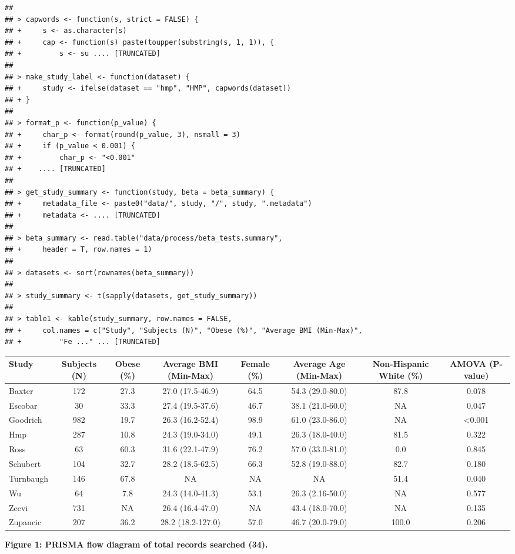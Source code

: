 \documentclass[12pt,]{article}
\begin{document}
\begin{verbatim}
## 
## > capwords <- function(s, strict = FALSE) {
## +     s <- as.character(s)
## +     cap <- function(s) paste(toupper(substring(s, 1, 1)), {
## +         s <- su .... [TRUNCATED] 
## 
## > make_study_label <- function(dataset) {
## +     study <- ifelse(dataset == "hmp", "HMP", capwords(dataset))
## + }
## 
## > format_p <- function(p_value) {
## +     char_p <- format(round(p_value, 3), nsmall = 3)
## +     if (p_value < 0.001) {
## +         char_p <- "<0.001"
## +    .... [TRUNCATED] 
## 
## > get_study_summary <- function(study, beta = beta_summary) {
## +     metadata_file <- paste0("data/", study, "/", study, ".metadata")
## +     metadata <- .... [TRUNCATED] 
## 
## > beta_summary <- read.table("data/process/beta_tests.summary", 
## +     header = T, row.names = 1)
## 
## > datasets <- sort(rownames(beta_summary))
## 
## > study_summary <- t(sapply(datasets, get_study_summary))
## 
## > table1 <- kable(study_summary, row.names = FALSE, 
## +     col.names = c("Study", "Subjects (N)", "Obese (%)", "Average BMI (Min-Max)", 
## +         "Fe ..." ... [TRUNCATED]
\end{verbatim}

\begin{longtable}[c]{@{}lccccccc@{}}
\toprule
Study & Subjects (N) & Obese (\%) & Average BMI (Min-Max) & Female (\%)
& Average Age (Min-Max) & Non-Hispanic White (\%) & AMOVA
(P-value)\tabularnewline
\midrule
\endhead
Baxter & 172 & 27.3 & 27.0 (17.5-46.9) & 64.5 & 54.3 (29.0-80.0) & 87.8
& 0.078\tabularnewline
Escobar & 30 & 33.3 & 27.4 (19.5-37.6) & 46.7 & 38.1 (21.0-60.0) & NA &
0.047\tabularnewline
Goodrich & 982 & 19.7 & 26.3 (16.2-52.4) & 98.9 & 61.0 (23.0-86.0) & NA
& \textless{}0.001\tabularnewline
Hmp & 287 & 10.8 & 24.3 (19.0-34.0) & 49.1 & 26.3 (18.0-40.0) & 81.5 &
0.322\tabularnewline
Ross & 63 & 60.3 & 31.6 (22.1-47.9) & 76.2 & 57.0 (33.0-81.0) & 0.0 &
0.845\tabularnewline
Schubert & 104 & 32.7 & 28.2 (18.5-62.5) & 66.3 & 52.8 (19.0-88.0) &
82.7 & 0.180\tabularnewline
Turnbaugh & 146 & 67.8 & NA & NA & NA & 51.4 & 0.040\tabularnewline
Wu & 64 & 7.8 & 24.3 (14.0-41.3) & 53.1 & 26.3 (2.16-50.0) & NA &
0.577\tabularnewline
Zeevi & 731 & NA & 26.4 (16.4-47.0) & NA & 43.4 (18.0-70.0) & NA &
0.135\tabularnewline
Zupancic & 207 & 36.2 & 28.2 (18.2-127.0) & 57.0 & 46.7 (20.0-79.0) &
100.0 & 0.206\tabularnewline
\bottomrule
\end{longtable}

\newpage

\textbf{Figure 1: PRISMA flow diagram of total records searched (34).}
\end{document}

